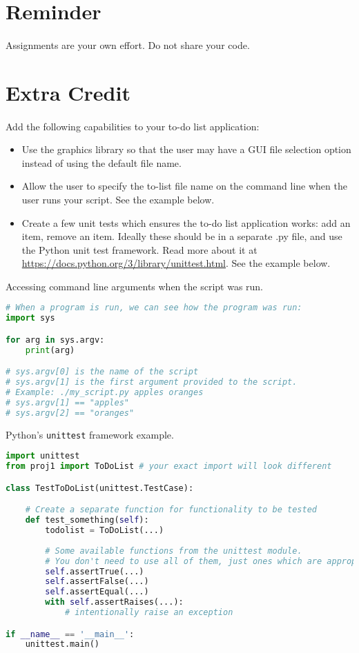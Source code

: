 \documentclass[letter,10pt]{article}
\begin{document}
    \section*{Reminder}
    \paragraph{}Assignments are your own effort. Do not share your code.
    
    \section*{Extra Credit}
    \paragraph{}Add the following capabilities to your to-do list application:
    \begin{itemize}
        \item Use the graphics library so that the user may have a GUI file selection option instead of using the default file name.
        \item Allow the user to specify the to-list file name on the command line when the user runs your script. See the example below.
        \item Create a few unit tests which ensures the to-do list application works: add an item, remove an item. Ideally these should be in a separate .py file, and use the Python unit test framework. Read more about it at \url{https://docs.python.org/3/library/unittest.html}. See the example below.
    \end{itemize}
    
    Accessing command line arguments when the script was run.
    \begin{lstlisting}[language=python]
# When a program is run, we can see how the program was run:
import sys

for arg in sys.argv:
    print(arg)

# sys.argv[0] is the name of the script
# sys.argv[1] is the first argument provided to the script.
# Example: ./my_script.py apples oranges
# sys.argv[1] == "apples"
# sys.argv[2] == "oranges"
    \end{lstlisting}
    
    Python's \texttt{unittest} framework example.
    \begin{lstlisting}[language=python]
import unittest
from proj1 import ToDoList # your exact import will look different

class TestToDoList(unittest.TestCase):

    # Create a separate function for functionality to be tested
    def test_something(self):
        todolist = ToDoList(...)
        
        # Some available functions from the unittest module.
        # You don't need to use all of them, just ones which are appropriate.
        self.assertTrue(...)
        self.assertFalse(...)
        self.assertEqual(...)
        with self.assertRaises(...):
            # intentionally raise an exception

if __name__ == '__main__':
    unittest.main()
    \end{lstlisting}
    
\end{document}
